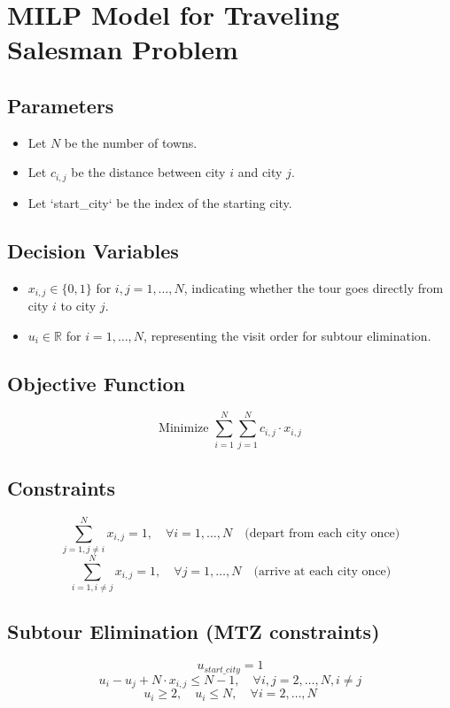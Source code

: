 \documentclass{article}
\begin{document}
\section*{MILP Model for Traveling Salesman Problem}

\subsection*{Parameters}
\begin{itemize}
    \item Let \( N \) be the number of towns.
    \item Let \( c_{i,j} \) be the distance between city \( i \) and city \( j \).
    \item Let `start\_city` be the index of the starting city.
\end{itemize}

\subsection*{Decision Variables}
\begin{itemize}
    \item \( x_{i,j} \in \{0, 1\} \) for \( i, j = 1, \ldots, N \), indicating whether the tour goes directly from city \( i \) to city \( j \).
    \item \( u_i \in \mathbb{R} \) for \( i = 1, \ldots, N \), representing the visit order for subtour elimination.
\end{itemize}

\subsection*{Objective Function}
\[
\text{Minimize } \sum_{i=1}^{N} \sum_{j=1}^{N} c_{i,j} \cdot x_{i,j}
\]

\subsection*{Constraints}
\[
\sum_{j=1, j \neq i}^{N} x_{i,j} = 1, \quad \forall i = 1, \ldots, N \quad \text{(depart from each city once)}
\]
\[
\sum_{i=1, i \neq j}^{N} x_{i,j} = 1, \quad \forall j = 1, \ldots, N \quad \text{(arrive at each city once)}
\]

\subsection*{Subtour Elimination (MTZ constraints)}
\[
u_{start\_city} = 1
\]
\[
u_i - u_j + N \cdot x_{i,j} \leq N - 1, \quad \forall i, j = 2, \ldots, N, i \neq j
\]
\[
u_i \geq 2, \quad u_i \leq N, \quad \forall i = 2, \ldots, N
\]
\end{document}
